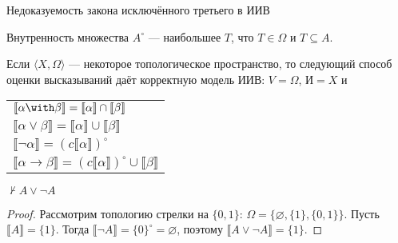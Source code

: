\documentclass[aspectratio=169]{beamer}
\begin{document}
\begin{frame}{Недоказуемость закона исключённого третьего в ИИВ}
\begin{defrus}Внутренность множества $A^\circ$ --- наибольшее $T$, что $T \in \Omega$ и $T \subseteq A$.\end{defrus}
\begin{thmrus}Если $\langle X, \Omega\rangle$ --- некоторое топологическое пространство, то следующий способ оценки высказываний
даёт корректную модель ИИВ: $V = \Omega$, $\text{И} = X$ и 
\begin{tabular}{l}
$\llbracket \alpha \with \beta \rrbracket = \llbracket \alpha \rrbracket \cap \llbracket \beta \rrbracket$\\
$\llbracket \alpha \vee \beta \rrbracket = \llbracket \alpha \rrbracket \cup \llbracket \beta \rrbracket$\\
$\llbracket \neg\alpha \rrbracket = (c\llbracket \alpha \rrbracket)^\circ$\\
$\llbracket \alpha \rightarrow \beta \rrbracket = (c\llbracket \alpha \rrbracket)^\circ \cup \llbracket \beta \rrbracket$
\end{tabular}
\end{thmrus}

\begin{thmrus}$\not\vdash A\vee\neg A$\end{thmrus}
\begin{proof}Рассмотрим топологию стрелки на $\{0,1\}$: $\Omega = \{\varnothing, \{1\}, \{0,1\}\}$. Пусть $\llbracket A \rrbracket = \{1\}$. Тогда 
$\llbracket\neg A\rrbracket = \{0\}^\circ = \varnothing$, поэтому $\llbracket A \vee \neg A \rrbracket = \{1\}$.\end{proof}
\end{frame}
\end{document}
